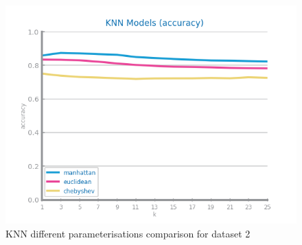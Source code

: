 \documentclass[10pt]{extarticle}
\begin{document}
\begin{figure}[H]
\centering\includegraphics[scale=0.95]{images/dataset2/models_evaluation/Credit_Score_knn_accuracy_study.png}
\caption{KNN different parameterisations comparison for dataset 2}
\end{figure}
\end{document}
